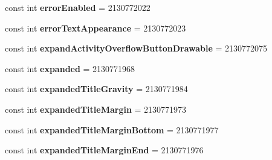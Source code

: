 \begin{DoxyCompactItemize}
\item 
\hypertarget{classClient_1_1Droid_1_1Resource_1_1Attribute_aa7866333b96e6de0aa0616be371a70c3}{}const int {\bfseries error\+Enabled} = 2130772022\label{classClient_1_1Droid_1_1Resource_1_1Attribute_aa7866333b96e6de0aa0616be371a70c3}

\item 
\hypertarget{classClient_1_1Droid_1_1Resource_1_1Attribute_ab3999adb6921f44d2cc4a64788c1af91}{}const int {\bfseries error\+Text\+Appearance} = 2130772023\label{classClient_1_1Droid_1_1Resource_1_1Attribute_ab3999adb6921f44d2cc4a64788c1af91}

\item 
\hypertarget{classClient_1_1Droid_1_1Resource_1_1Attribute_a9b0e071cc3be20b0c64ca825522adac5}{}const int {\bfseries expand\+Activity\+Overflow\+Button\+Drawable} = 2130772075\label{classClient_1_1Droid_1_1Resource_1_1Attribute_a9b0e071cc3be20b0c64ca825522adac5}

\item 
\hypertarget{classClient_1_1Droid_1_1Resource_1_1Attribute_a28447808de66c9552abedb6e9c0a58c3}{}const int {\bfseries expanded} = 2130771968\label{classClient_1_1Droid_1_1Resource_1_1Attribute_a28447808de66c9552abedb6e9c0a58c3}

\item 
\hypertarget{classClient_1_1Droid_1_1Resource_1_1Attribute_ac96dc71b21f6a10cf3a86de64870548f}{}const int {\bfseries expanded\+Title\+Gravity} = 2130771984\label{classClient_1_1Droid_1_1Resource_1_1Attribute_ac96dc71b21f6a10cf3a86de64870548f}

\item 
\hypertarget{classClient_1_1Droid_1_1Resource_1_1Attribute_a6118055b1d7baed6d24e14dd76b754c9}{}const int {\bfseries expanded\+Title\+Margin} = 2130771973\label{classClient_1_1Droid_1_1Resource_1_1Attribute_a6118055b1d7baed6d24e14dd76b754c9}

\item 
\hypertarget{classClient_1_1Droid_1_1Resource_1_1Attribute_af8e8542693f7dcdbde8b4fde251e63a5}{}const int {\bfseries expanded\+Title\+Margin\+Bottom} = 2130771977\label{classClient_1_1Droid_1_1Resource_1_1Attribute_af8e8542693f7dcdbde8b4fde251e63a5}

\item 
\hypertarget{classClient_1_1Droid_1_1Resource_1_1Attribute_a63f2e39046386fff09a0d11f1a2c811d}{}const int {\bfseries expanded\+Title\+Margin\+End} = 2130771976\label{classClient_1_1Droid_1_1Resource_1_1Attribute_a63f2e39046386fff09a0d11f1a2c811d}


\end{DoxyCompactItemize}
